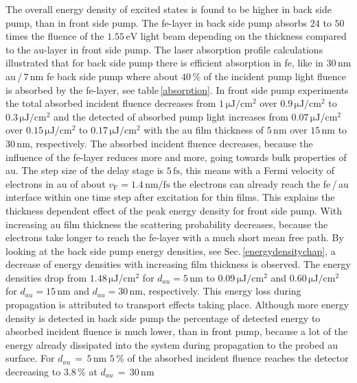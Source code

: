 \documentclass[a4paper,12pt,twoside]{article}
\begin{document}
The overall energy density of excited states is found to be higher in back side pump, than in front side pump. The \gls{fe}-layer in back side pump absorbs $24$ to $50$ times the fluence of the $1.55\,\mathrm{eV}$ light beam depending on the thickness compared to the \gls{au}-layer in front side pump. The laser absorption profile calculations illustrated that for back side pump there is efficient absorption in \gls{fe}, like in $30\,\mathrm{nm}$ \gls{au}\,/\,$7\,\mathrm{nm}$ \gls{fe} back side pump where about $40\,\%$ of the incident pump light fluence is absorbed by the \gls{fe}-layer, see table\,\ref{absorption}. In front side pump experiments the total absorbed incident fluence decreases from $1\,\mathrm{\mu J/cm^2}$ over $0.9\,\mathrm{\mu J/cm^2}$ to $0.3\,\mathrm{\mu J/cm^2}$ and the detected of absorbed pump light increases from $0.07\,\mathrm{\mu J/cm^2}$ over $0.15\,\mathrm{\mu J/cm^2}$ to $0.17\,\mathrm{\mu J/cm^2}$ with the \gls{au} film thickness of $5\,\mathrm{nm}$ over $15\,\mathrm{nm}$ to $30\,\mathrm{nm}$, respectively. The absorbed incident fluence decreases, because the influence of the \gls{fe}-layer reduces more and more, going towards bulk properties of \gls{au}. The step size of the delay stage is $5\,\mathrm{fs}$, this means with a Fermi velocity of electrons in \gls{au} of about $v_\mathrm{F} = 1.4\,\mathrm{nm/fs}$ the electrons can already reach the \gls{fe}\,/\,\gls{au} interface within one time step after excitation for thin films. This explains the thickness dependent effect of the peak energy density for front side pump. With increasing \gls{au} film thickness the scattering probability decreases, because the electrons take longer to reach the \gls{fe}-layer with a much short mean free path. By looking at the back side pump energy densities, see Sec.\,\ref{energydensitychap}, a decrease of energy densities with increasing film thickness is observed. The energy densities drop from $1.48\,\mathrm{\mu J/cm^2}$ for $d_{au} = 5\,\mathrm{nm}$ to $0.09\,\mathrm{\mu J/cm^2}$ and $0.60\,\mathrm{\mu J/cm^2}$ for $d_{au} = 15\,\mathrm{nm}$ and $d_{au} = 30\,\mathrm{nm}$, respectively. This energy loss during propagation is attributed to transport effects taking place. Although more energy density is detected in back side pump the percentage of detected energy to absorbed incident fluence is much lower, than in front pump, because a lot of the energy already dissipated into the system during propagation to the probed \gls{au} surface. For $d_{au}\,=\, 5\,\mathrm{nm}$ $5\,\%$ of the absorbed incident fluence reaches the detector decreasing to $3.8\,\%$ at $d_{au}\,=\, 30\,\mathrm{nm}$
\end{document}
